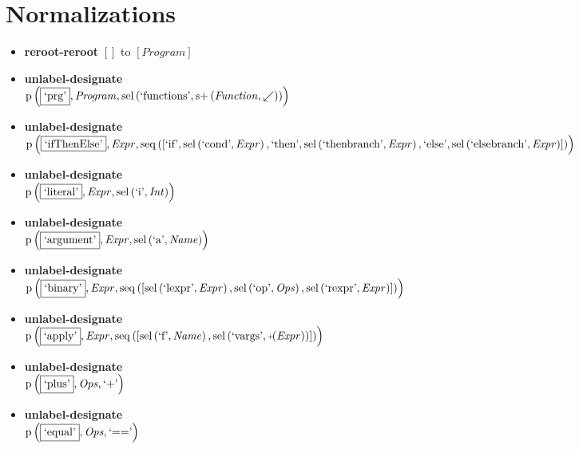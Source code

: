 \section{Normalizations}
{\footnotesize\begin{itemize}
\item \textbf{reroot-reroot} $\left[\right]$ to $\left[\mathit{Program}\right]$
\item \textbf{unlabel-designate}\\$\mathrm{p}\left(\fbox{\text{`prg'}},\mathit{Program},\mathrm{sel}\left(\text{`functions'},\mathrm{s}{+}\left(\mathit{Function},{\swarrow}\right)\right)\right)$
\item \textbf{unlabel-designate}\\$\mathrm{p}\left(\fbox{\text{`ifThenElse'}},\mathit{Expr},\mathrm{seq}\left(\left[\text{`if'}, \mathrm{sel}\left(\text{`cond'},\mathit{Expr}\right), \text{`then'}, \mathrm{sel}\left(\text{`thenbranch'},\mathit{Expr}\right), \text{`else'}, \mathrm{sel}\left(\text{`elsebranch'},\mathit{Expr}\right)\right]\right)\right)$
\item \textbf{unlabel-designate}\\$\mathrm{p}\left(\fbox{\text{`literal'}},\mathit{Expr},\mathrm{sel}\left(\text{`i'},\mathit{Int}\right)\right)$
\item \textbf{unlabel-designate}\\$\mathrm{p}\left(\fbox{\text{`argument'}},\mathit{Expr},\mathrm{sel}\left(\text{`a'},\mathit{Name}\right)\right)$
\item \textbf{unlabel-designate}\\$\mathrm{p}\left(\fbox{\text{`binary'}},\mathit{Expr},\mathrm{seq}\left(\left[\mathrm{sel}\left(\text{`lexpr'},\mathit{Expr}\right), \mathrm{sel}\left(\text{`op'},\mathit{Ops}\right), \mathrm{sel}\left(\text{`rexpr'},\mathit{Expr}\right)\right]\right)\right)$
\item \textbf{unlabel-designate}\\$\mathrm{p}\left(\fbox{\text{`apply'}},\mathit{Expr},\mathrm{seq}\left(\left[\mathrm{sel}\left(\text{`f'},\mathit{Name}\right), \mathrm{sel}\left(\text{`vargs'},\plus \left(\mathit{Expr}\right)\right)\right]\right)\right)$
\item \textbf{unlabel-designate}\\$\mathrm{p}\left(\fbox{\text{`plus'}},\mathit{Ops},\text{`+'}\right)$
\item \textbf{unlabel-designate}\\$\mathrm{p}\left(\fbox{\text{`equal'}},\mathit{Ops},\text{`=='}\right)$

\end{itemize}}
